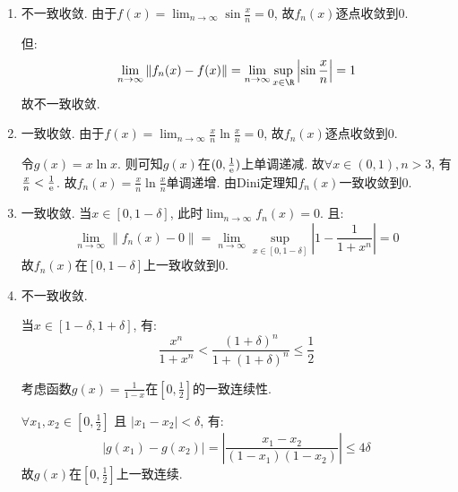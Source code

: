 \begin{solution}
    \begin{enumerate}
        \item 不一致收敛.
            由于\(f(x)=\lim_{n \to \infty} \sin \frac{x}{n} = 0\),
            故\(f_{n}(x)\)逐点收敛到\(0\).

            但:
            \[
                \lim_{n \to \infty} \left\lVert f_{n}(x) -
                f(x) \right\rVert
                = \lim_{n \to \infty} \sup_{x \in
                \R} \left\lvert \sin
                \frac{x}{n} \right\rvert
                = 1
            \]
            故不一致收敛.

        \item 一致收敛.
            由于\(f(x)=\lim_{n \to \infty} \frac{x}{n} \ln
            \frac{x}{n} = 0\),
            故\(f_{n}(x)\)逐点收敛到\(0\).

            令\(g(x)=x \ln x\). 则可知\(g(x)\)在\((0,\frac{1}{\mathrm{e}})\)上单调递减.
            故\(\forall x \in (0,1), n > 3\), 有\(\frac{x}{n} <
            \frac{1}{\mathrm{e}}\). 故\(f_{n}(x) = \frac{x}{n} \ln
            \frac{x}{n}\)单调递增. 由Dini定理知\(f_{n}(x)\)一致收敛到\(0\).

        \item 一致收敛.
            当\(x \in [0,1-\delta]\), 此时\(\lim_{n \to
            \infty}f_{n}(x) = 0\). 且:
            \[
                \lim_{n \to \infty}\left\lVert f_{n}(x) - 0
                \right\rVert
                = \lim_{n \to \infty} \sup_{x \in
                [0,1-\delta]} \left\vert 1 -
                \frac{1}{1+ x^{n}} \right\vert
                = 0
            \]
            故\(f_{n}(x)\)在\([0,1-\delta]\)上一致收敛到\(0\).

        \item 不一致收敛.

            当\(x \in [1-\delta,1+\delta]\), 有:
            \[
                \frac{x^{n}}{1 + x^{n}} < \frac{(1+\delta)^{n}}{1+
                (1+\delta)^{n}} \le \frac{1}{2}
            \]

            考虑函数\(g(x) = \frac{1}{1-x}\)在\([0,\frac{1}{2}]\)的一致连续性.

            \(\forall x_1, x_2 \in [0, \frac{1}{2}]\) 且
            \(\left\vert x_1 - x_2
            \right\vert < \delta\), 有:
            \[
                \left\vert g(x_1) - g(x_2) \right\vert
                = \left\vert \frac{x_1 -
                x_2}{(1-x_1)(1-x_2)} \right\vert
                \le 4 \delta
            \]
            故\(g(x)\)在\([0,\frac{1}{2}]\)上一致连续.


\end{enumerate}
\end{solution}
